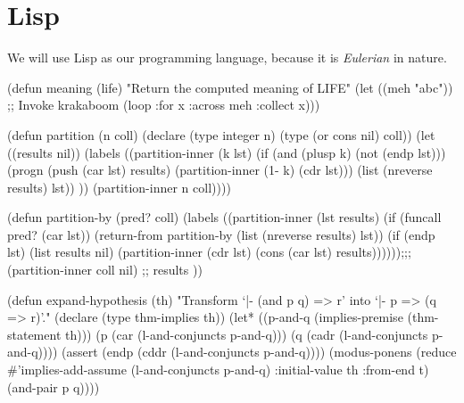 \chapter{Lisp}

\M
We will use Lisp as our programming language, because it is
\emph{Eulerian} in nature.

\begin{code}
(defun meaning (life)
  "Return the computed meaning of LIFE"
  (let ((meh "abc"))
    ;; Invoke krakaboom
    (loop :for x :across meh
       :collect x)))

(defun partition (n coll)
  (declare (type integer n)
           (type (or cons nil) coll))
  (let ((results nil))
    (labels ((partition-inner (k lst)
               (if (and (plusp k)
                        (not (endp lst)))
                   (progn
                     (push (car lst) results)
                     (partition-inner (1- k) (cdr lst)))
                   (list (nreverse results) lst))
               ))
      (partition-inner n coll))))

(defun partition-by (pred? coll)
  (labels ((partition-inner (lst results)
             (if (funcall pred? (car lst))
                 (return-from partition-by (list (nreverse results) lst))
                 (if (endp lst)
                     (list results nil)
                     (partition-inner (cdr lst) (cons (car lst) results))))));;;
    (partition-inner coll nil)
    ;; results
    ))

(defun expand-hypothesis (th)
  "Transform `|- (and p q) => r' into `|- p => (q => r)'."
  (declare (type thm-implies th))
  (let* ((p-and-q (implies-premise (thm-statement th)))
         (p (car (l-and-conjuncts p-and-q)))
         (q (cadr (l-and-conjuncts p-and-q))))
    (assert (endp (cddr (l-and-conjuncts p-and-q))))
    (modus-ponens (reduce #'implies-add-assume
                          (l-and-conjuncts p-and-q)
                          :initial-value th
                          :from-end t)
                  (and-pair p q))))
\end{code}
